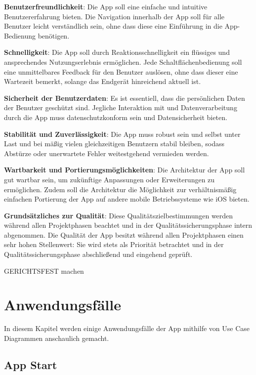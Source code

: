\documentclass[oneside, ngerman]{sdqtechreport}
\begin{document}
\textbf{Benutzerfreundlichkeit}: Die App soll eine einfache und intuitive Benutzererfahrung bieten. Die Navigation innerhalb der App soll für alle Benutzer leicht verständlich sein, ohne dass diese eine Einführung in die App-Bedienung benötigen.

\textbf{Schnelligkeit}: Die App soll durch Reaktionsschnelligkeit ein flüssiges und ansprechendes Nutzungserlebnis ermöglichen. Jede Schaltflächenbedienung soll eine unmittelbares Feedback für den Benutzer auslösen, ohne dass dieser eine Wartezeit bemerkt, solange das Endgerät hinreichend aktuell ist.

\textbf{Sicherheit der Benutzerdaten}: Es ist essentiell, dass die persönlichen Daten der Benutzer geschützt sind. Jegliche Interaktion mit und Datenverarbeitung durch die App muss datenschutzkonform sein und Datensicherheit bieten.

\textbf{Stabilität und Zuverlässigkeit}: Die App muss robust sein und selbst unter Last und bei mäßig vielen gleichzeitigen Benutzern stabil bleiben, sodass Abstürze oder unerwartete Fehler weitestgehend vermieden werden.

\textbf{Wartbarkeit und Portierungsmöglichkeiten}: Die Architektur der App soll gut wartbar sein, um zukünftige Anpassungen oder Erweiterungen zu ermöglichen. Zudem soll die Architektur die Möglichkeit zur verhältnismäßig einfachen Portierung der App auf andere mobile Betriebssysteme wie iOS bieten. 

\textbf{Grundsätzliches zur Qualität}: Diese Qualitätszielbestimmungen werden während allen Projektphasen beachtet und in der Qualitätssicherungsphase intern abgenommen. Die Qualität der App besitzt während allen Projektphasen einen sehr hohen Stellenwert: Sie wird stets als Priorität betrachtet und in der Qualitätssicherungsphase abschließend und eingehend geprüft.

GERICHTSFEST machen



\chapter{Anwendungsfälle}
\label{chap:Anwendungsfälle}

In diesem Kapitel werden einige Anwendungsfälle der App mithilfe von Use Case Diagrammen anschaulich gemacht.

\section{App Start}
\label{sec:Anwendungsfälle:App Start}
\end{document}

